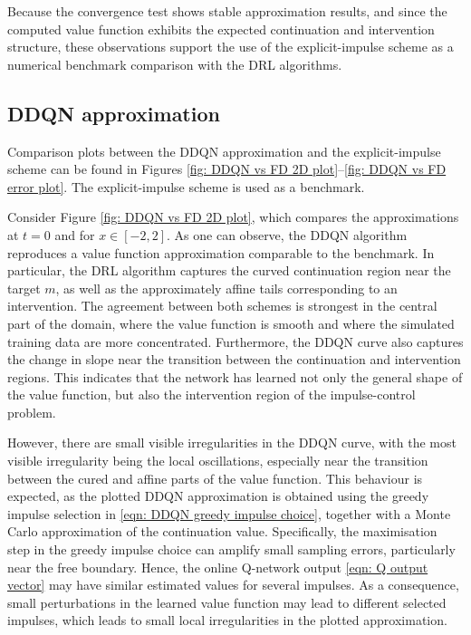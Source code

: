 Because the convergence test shows stable approximation results, and since the computed value
function exhibits the expected continuation and intervention structure, these observations support the use of the explicit-impulse scheme as a numerical benchmark comparison with the DRL algorithms. 

\subsection{DDQN approximation}
Comparison plots between the DDQN approximation and the explicit-impulse scheme can be found in Figures \ref{fig: DDQN vs FD 2D plot}--\ref{fig: DDQN vs FD error plot}. The explicit-impulse scheme is used as a benchmark.

Consider Figure \ref{fig: DDQN vs FD 2D plot}, which compares the approximations at $t=0$ and for $x \in [-2,2]$. As one can observe, the DDQN algorithm reproduces a value function approximation comparable to the benchmark. In particular, the DRL algorithm captures the curved continuation region near the target $m$, as well as the approximately affine tails corresponding to an intervention. The agreement between both schemes is strongest in the central part of the domain, where the value function is smooth and where the simulated training data are more concentrated. Furthermore, the DDQN curve also captures the change in slope near the transition between the continuation and intervention regions. This indicates that the network has learned not only the general shape of the value function, but also the intervention region of the impulse-control problem.

However, there are small visible irregularities in the DDQN curve, with the most visible irregularity being the local oscillations, especially near the transition between the cured and affine parts of the value function. This behaviour is expected, as the plotted DDQN approximation is obtained using the greedy impulse selection in \eqref{eqn: DDQN greedy impulse choice}, together with a Monte Carlo approximation of the continuation value. Specifically, the maximisation step in the greedy impulse choice can amplify small sampling errors, particularly near the free boundary. Hence, the online Q-network output \eqref{eqn: Q output vector} may have similar estimated values for several impulses. As a consequence, small perturbations in the learned value function may lead to different selected impulses, which leads to small
local irregularities in the plotted approximation.

